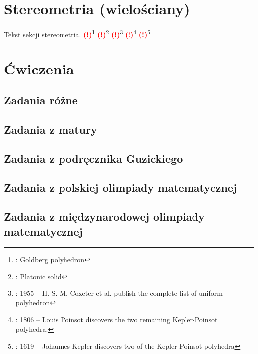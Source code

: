 \documentclass{greaseproof}
\newcommand{\todofoot}[1]{\textcolor{red}{\textbf{(!)}\footnote{\textbf{\color{red}{Do zrobienia}}: #1}}}
\begin{document}
\section{Stereometria (wielościany)}
Tekst sekcji stereometria.
\todofoot{Goldberg polyhedron} %
\todofoot{Platonic solid} %
\todofoot{1955 – H. S. M. Coxeter et al. publish the complete list of uniform polyhedron}
\todofoot{1806 – Louis Poinsot discovers the two remaining Kepler-Poinsot polyhedra.}
\todofoot{1619 – Johannes Kepler discovers two of the Kepler-Poinsot polyhedra}

\section{Ćwiczenia}
\subsection{Zadania różne}


\subsection{Zadania z matury}

\subsection{Zadania z podręcznika Guzickiego}

\subsection{Zadania z polskiej olimpiady matematycznej}

\subsection{Zadania z międzynarodowej olimpiady matematycznej}



{}


\raggedright
{}
\printindex

\printindex[persons]
\end{document}

